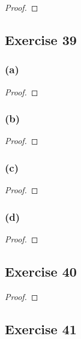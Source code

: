 \documentclass[14pt]{extarticle}
\begin{document}
\begin{proof}

\end{proof}

\subsection{Exercise 39}

\subsubsection{(a)}

\begin{proof}

\end{proof}

\subsubsection{(b)}

\begin{proof}

\end{proof}

\subsubsection{(c)}

\begin{proof}

\end{proof}

\subsubsection{(d)}

\begin{proof}

\end{proof}

\subsection{Exercise 40}

\begin{proof}

\end{proof}

\subsection{Exercise 41}
\end{document}
